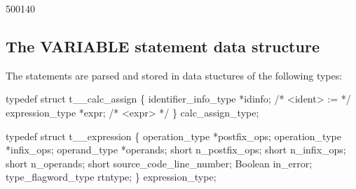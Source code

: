 \startfig
\begin{fast_picture}{500}{140}
\putuponebox\savFboxpos
{}\savHboxpos
{}
    \nextFbox{}
          \nextBbox{}
          \nextBbox{}
          \nextBbox{}
          \nextBbox{}
          \nextBbox{}
    \nextFbox{}
          \stackBbox
          \nextBbox\valbox{}
          \nextBbox\valbox{}
          \nextBbox\valbox{}
    \nextFbox{}
\nextHbox{}
          \nextBbox{}
\nextHbox{}
\nextHbox{}
\end{fast_picture}

\subsection{The VARIABLE statement data structure}
\label{sec:calc}

The  statements are parsed and stored in data stuctures
of the following types:
\begin{codeexample}
typedef struct t__calc_assign
   \{
       identifier_info_type *idinfo;  /* <ident> := */
       expression_type *expr;         /*            <expr> */
   \} calc_assign_type;
\end{codeexample}

\begin{codeexample}
typedef struct t__expression
   \{
       operation_type *postfix_ops;
       operation_type *infix_ops;
       operand_type *operands;
       short n_postfix_ops;
       short n_infix_ops;
       short n_operands;
       short source_code_line_number;
       Boolean in_error;
       type_flagword_type rtntype;
   \} expression_type;
\end{codeexample}

